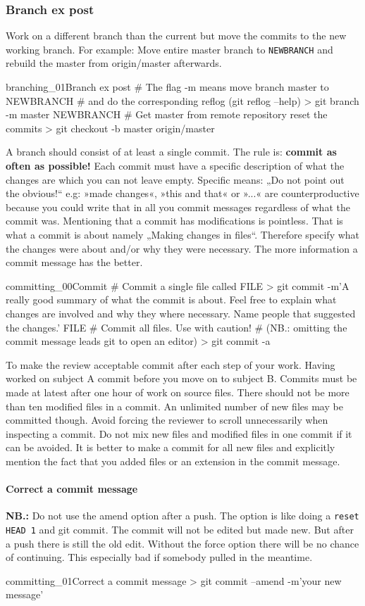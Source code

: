 \subsubsection{Branch ex post}
Work on a different branch than the current but move the commits to the new working branch. For example: Move entire master branch to \texttt{NEWBRANCH} and rebuild the master from origin/master afterwards. 
\begin{codelisting}{branching_01}{Branch ex post}
# The flag -m means move branch master to NEWBRANCH
# and do the corresponding reflog (git reflog --help)
> git branch -m master NEWBRANCH
# Get master from remote repository reset the commits
> git checkout -b master origin/master
\end{codelisting}
A branch should consist of at least a single commit. The rule is: \textbf{commit as often as possible!} Each commit must have a specific description of what the changes are which you can not leave empty. Specific means: „Do not point out the obvious!“ e.g: »made changes«, »this and that« or »...« are counterproductive because you could write that in all you commit messages regardless of what the commit was. Mentioning that a commit has modifications is pointless. That is what a commit is about namely „Making changes in files“. Therefore specify what the changes were about and/or why they were necessary.  The more information a commit message has the better.
\begin{codelisting}{committing_00}{Commit}
# Commit a single file called FILE
> git commit -m'A really good summary of what the commit is about. Feel free to explain what changes are involved and why they where necessary. Name people that suggested the changes.' FILE
# Commit all files. Use with caution!
# (NB.: omitting the commit message leads git to open an editor)
> git commit -a
\end{codelisting}
To make the review acceptable commit after each step of your work. Having worked on subject A commit before you move on to subject B. Commits must be made at latest after one hour of work on source files. There should not be more than ten modified files in a commit. An unlimited number of new files may be committed though. Avoid forcing the reviewer to scroll unnecessarily when inspecting a commit. Do not mix new files and modified files in one commit if it can be avoided. It is better to make a commit for all new files and explicitly mention the fact that you added files or an extension in the commit message.
\paragraph{Correct a commit message}
\textbf{NB.:} Do not use the amend option after a push. The option is like doing a \texttt{reset HEAD~1} and git commit. The commit will not be edited but made new. But after a push there is still the old edit. Without the force option there will be no chance of continuing. This especially bad if somebody pulled in the meantime.
\begin{codelisting}{committing_01}{Correct a commit message}
> git commit --amend -m'your new message'
\end{codelisting}
